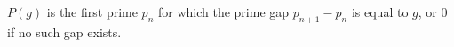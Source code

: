 \begin{definition}
\label{first-gap-def}
\leanok
$P(g)$ is the first prime $p_n$ for which the prime gap
  $p_{n+1}-p_n$ is equal to $g$, or $0$ if no such gap
  exists.
\end{definition}
